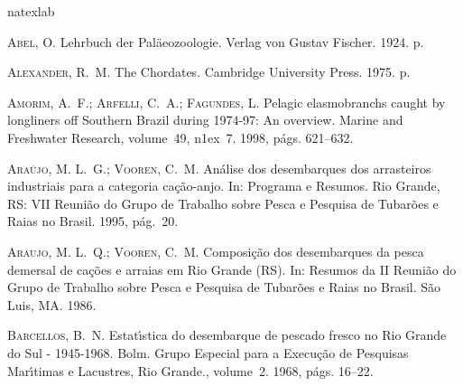 \documentclass[a4paper,11pt,twoside,showtrims,onecolumn,openright,final]{memoir}
\begin{document}


\newpage



% 
% 

\begin{thebibliography}{194}
\expandafter\ifx\csname natexlab\endcsname\relax\def\natexlab#1{#1}\fi

\textsc{Abel, O.}
\newblock Lehrbuch der {P}al\"aeozoologie.
\newblock Verlag von Gustav Fischer. 1924.
 p.

\textsc{Alexander, R.~M.}
\newblock The {C}hordates.
\newblock Cambridge University Press. 1975.
 p.

\textsc{Amorim, A.~F.; Arfelli, C.~A.; Fagundes, L.}
\newblock Pelagic elasmobranchs caught by longliners off {S}outhern {B}razil
  during 1974-97: {A}n overview.
\newblock Marine and Freshwater Research, volume~49,
  n\raise1ex\hbox{}~7. 1998, p\'ags. 621--632.

\textsc{Ara\'ujo, M. L.~G.; Vooren, C.~M.}
\newblock An\'alise dos desembarques dos arrasteiros industriais para a
  categoria ca\c{c}\~ao-anjo.
\newblock In: Programa e {R}esumos. Rio Grande, RS: VII Reuni\~ao do Grupo de
  Trabalho sobre Pesca e Pesquisa de Tubar\~oes e Raias no Brasil. 1995,
  p\'ag.~20.

\textsc{Araujo, M. L.~Q.; Vooren, C.~M.}
\newblock Composi\c{c}\~ao dos desembarques da pesca demersal de ca\c{c}\~oes e
  arraias em {R}io {G}rande ({RS}).
\newblock In: Resumos da {II} {R}euni\~ao do {G}rupo de {T}rabalho sobre
  {P}esca e {P}esquisa de {T}ubar\~oes e {R}aias no {B}rasil. S\~ao Luis, MA.
  1986.

\textsc{Barcellos, B.~N.}
\newblock Estat\'{\i}stica do desembarque de pescado fresco no {R}io {G}rande
  do {S}ul - 1945-1968.
\newblock Bolm. Grupo Especial para a Execu\c{c}\~ao de Pesquisas
  Mar\'{\i}timas e Lacustres, Rio Grande., volume~2. 1968, p\'ags. 16--22.


\end{thebibliography}
\end{document}
